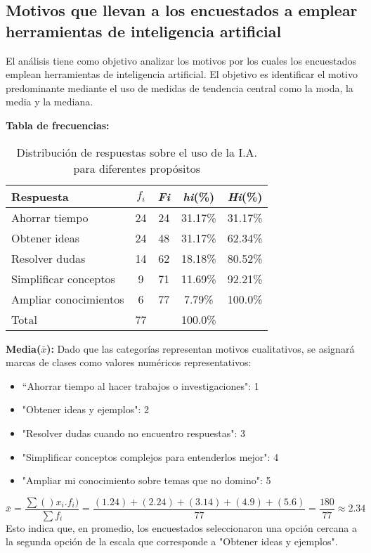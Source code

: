 \subsection{Motivos que llevan a los encuestados a emplear herramientas de inteligencia artificial}

El análisis tiene como objetivo analizar los motivos por los cuales los encuestados emplean herramientas de inteligencia artificial. El objetivo es identificar el motivo predominante mediante el uso de medidas de tendencia central como la moda, la media y la mediana.

\textbf{Tabla de frecuencias:}
\begin{table}[H]
	\centering
	\renewcommand{\arraystretch}{1.2}
	\begin{tabular}{l c c c c}
		\hline
		{Respuesta} & {\(f_i\)} & \textit{Fi} & \textit{hi}(\%) & \textit{Hi}(\%)\\
		\hline
		Ahorrar tiempo        & 24 & 24 & 31.17\% & 31.17\%\\
		Obtener ideas         & 24 & 48 & 31.17\% & 62.34\%\\
		Resolver dudas        & 14 & 62 & 18.18\% & 80.52\%\\
		Simplificar conceptos & 9  & 71 & 11.69\% & 92.21\%\\
		Ampliar conocimientos & 6  & 77 & 7.79\%  & 100.0\%\\
		\hline
		Total                 & 77 &    & 100.0\%\\
		\hline
	\end{tabular}
	\caption{Distribución de respuestas sobre el uso de la I.A. para diferentes propósitos}
	\label{tabla:motivos}
\end{table}

\textbf{Media($\bar{x}$):} Dado que las categorías representan motivos cualitativos, se asignará marcas de clases como valores numéricos representativos:
\begin{itemize}
	\item “Ahorrar tiempo al hacer trabajos o investigaciones": 1
	\item "Obtener ideas y ejemplos": 2
	\item "Resolver dudas cuando no encuentro respuestas": 3
	\item "Simplificar conceptos complejos para entenderlos mejor": 4
	\item "Ampliar mi conocimiento sobre temas que no domino": 5
\end{itemize}
\begin{equation*}
	\bar{x} = \frac{\sum ()x_i . f_i)}{\sum f_i} = \frac{(1 . 24)+ (2 . 24) + (3 . 14) + (4 . 9) + (5 . 6)}{77} = \frac{180}{77} \approx 2.34
\end{equation*}
Esto indica que, en promedio, los encuestados seleccionaron una opción cercana a la segunda opción de la escala que corresponde a "Obtener ideas y ejemplos".

